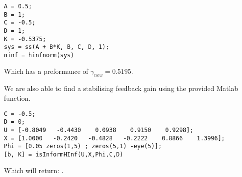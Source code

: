 \begin{lstlisting}
A = 0.5;
B = 1;
C = -0.5;
D = 1;
K = -0.5375;
sys = ss(A + B*K, B, C, D, 1);
ninf = hinfnorm(sys)
\end{lstlisting}
Which has a preformance of $\gamma_{new} = 0.5195$. 

We are also able to find a stabilising feedback gain using the provided Matlab function.
\begin{lstlisting}
C = -0.5;
D = 0;
U = [-0.8049   -0.4430    0.0938    0.9150    0.9298];
X = [1.0000   -0.2420   -0.4828   -0.2222    0.8866    1.3996];
Phi = [0.05 zeros(1,5) ; zeros(5,1) -eye(5)];
[b, K] = isInformHInf(U,X,Phi,C,D)
\end{lstlisting}
Which will return: \mon{[ 1, -0.5375 ]}.

























